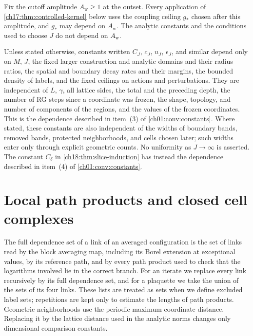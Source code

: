 Fix the cutoff amplitude $A_{\mathrm w}\ge1$ at the outset. Every application of \cref{ch17:thm:controlled-kernel} below uses the coupling ceiling $g_*$ chosen after this amplitude, and $g_*$ may depend on $A_{\mathrm w}$. The analytic constants and the conditions used to choose $J$ do not depend on $A_{\mathrm w}$.

Unless stated otherwise, constants written $C_J$, $c_J$, $u_J$, $\epsilon_J$, and similar depend only on $M$, $J$, the fixed larger construction and analytic domains and their radius ratios, the spatial and boundary decay rates and their margins, the bounded density of labels, and the fixed ceilings on actions and perturbations. They are independent of $L$, $\gamma$, all lattice sides, the total and the preceding depth, the number of RG steps since a coordinate was frozen, the shape, topology, and number of components of the regions, and the values of the frozen coordinates. This is the dependence described in item~(3) of \cref{ch01:conv:constants}. Where stated, these constants are also independent of the widths of boundary bands, removed bands, protected neighborhoods, and cells chosen later; such widths enter only through explicit geometric counts. No uniformity as $J\to\infty$ is asserted. The constant $C_\delta$ in \cref{ch18:thm:slice-induction} has instead the dependence described in item~(4) of \cref{ch01:conv:constants}.

\section{Local path products and closed cell complexes}\label{ch18:sec:local}

The full dependence set of a link of an averaged configuration is the set of links read by the block averaging map, including its Borel extension at exceptional values, by its reference path, and by every path product used to check that the logarithms involved lie in the correct branch. For an iterate we replace every link recursively by its full dependence set, and for a plaquette we take the union of the sets of its four links. These lists are treated as sets when we define excluded label sets; repetitions are kept only to estimate the lengths of path products. Geometric neighborhoods use the periodic maximum coordinate distance. Replacing it by the lattice distance used in the analytic norms changes only dimensional comparison constants.

